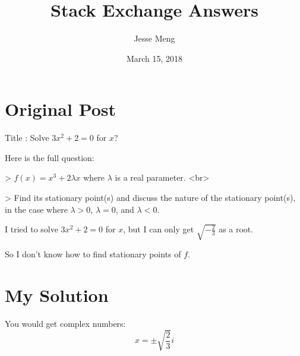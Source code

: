 \documentclass{article}
\title{Stack Exchange Answers}
\author{Jesse Meng }
\date{March 15, 2018}
\begin{document}
\maketitle

\section{Original Post}
Title : Solve $3x^2+2=0$ for $ x$?

Here is the full question:

> $ f(x) = x^3 + 2λx $ where $\lambda $ is a real parameter. <br>

> Find its stationary point(s) and discuss the nature of the stationary point(s), in the case where $\lambda > 0$, $\lambda  = 0$, and $\lambda < 0$.

I tried to solve $3x^2 + 2 = 0$ for $x$, but I can only get $\sqrt{-\frac 23}$ as a root.

So I don't know how to find stationary points of $f$.

\section{My Solution}
You would get complex numbers:
$$x=\pm\sqrt{\frac{2}{3}}i$$
\end{document}
